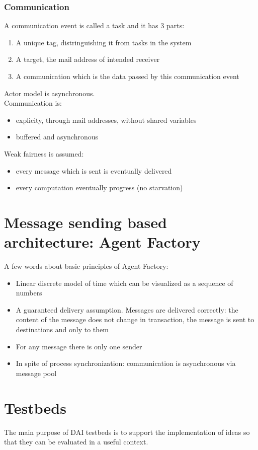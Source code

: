 \subsubsection{Communication}
A communication event is called a task and it has 3 parts:
\begin{enumerate}
\item A unique tag, distringuishing it from tasks in the system
\item A target, the mail address of intended receiver
\item A communication which is the data passed by this communication event
\end{enumerate}

Actor model is asynchronous.\\
Communication is:
\begin{itemize}
\item explicity, through mail addresses, without shared variables 
\item buffered and asynchronous
\end{itemize}
Weak fairness is assumed:
\begin{itemize}
\item every message which is sent is eventually delivered
\item every computation eventually progress (no starvation)
\end{itemize}


\section{Message sending based architecture: Agent Factory}
A few words about basic principles of Agent Factory:
\begin{itemize}
\item Linear discrete model of time which can be visualized as a sequence of numbers
\item A guaranteed delivery assumption. Messages are delivered correctly: the content of the message does not change in transaction, the message is sent to destinations and only to them
\item For any message there is only one sender
\item In spite of process synchronization: communication is asynchronous via message pool
\end{itemize}
\section{Testbeds}
The main purpose of DAI testbeds is to support the implementation of ideas so that they can be evaluated in a useful context.

